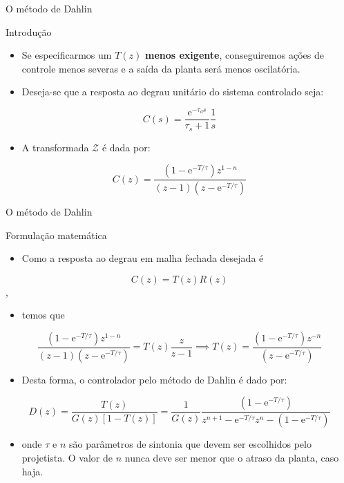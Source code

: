 \begin{frame}{O método de Dahlin}
\begin{block}{Introdução}
\begin{itemize}
    \item Se especificarmos um $T(z)$ \textbf{menos exigente}, conseguiremos ações  de controle menos severas e a saída da planta será menos oscilatória.
    \item Deseja-se que a resposta ao degrau unitário do sistema controlado seja:
\end{itemize}
$$C(s) = \dfrac{\text{e}^{-\tau_d s}}{\tau_s + 1}\dfrac{1}{s}$$
\begin{itemize}
    \item A transformada $ \mathcal{Z} $ é dada por:
\end{itemize}
$$C(z) = \dfrac{(1-\text{e}^{-T/\tau})z^{1-n}}{(z-1)(z-\text{e}^{-T/\tau})}$$
\end{block}
\end{frame}

\begin{frame}{O método de Dahlin}
\begin{block}{Formulação matemática}
\begin{itemize}
    \item Como a resposta ao degrau em malha fechada desejada é
\end{itemize}
$$C(z) = T(z) R(z)$$,
\vspace{-0.3cm}
\begin{itemize}
    \item[] temos que
\end{itemize}
$$\dfrac{(1-\text{e}^{-T/\tau})z^{1-n}}{(z-1)(z-\text{e}^{-T/\tau})} = T(z) \dfrac{z}{z-1} \implies T(z) = \dfrac{(1-\text{e}^{-T/\tau})z^{-n}}{(z-\text{e}^{-T/\tau})}$$
\begin{itemize}
    \item Desta forma, o controlador pelo método de Dahlin é dado por:
\end{itemize}
$$D(z) = \dfrac{T(z)}{G(z)[1-T(z)]} = \dfrac{1}{G(z)} \dfrac{(1-\text{e}^{-T/\tau})}{z^{n+1}-\text{e}^{-T/\tau}z^n - (1-\text{e}^{-T/\tau})}$$
\begin{itemize}
    \item[] onde $\tau$ e $n$ são parâmetros de sintonia que  devem ser escolhidos pelo projetista. O valor de $n$ nunca deve ser menor que o atraso da planta, caso haja. 
\end{itemize}
\end{block}
\end{frame}

